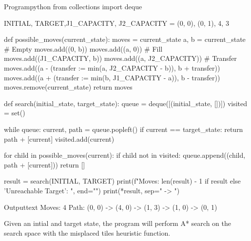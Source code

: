 \documentclass[11pt]{ipu-ai}
\begin{document}
    \begin{code}
        {Program}{python}
from collections import deque

INITIAL, TARGET,J1_CAPACITY, J2_CAPACITY = (0, 0), (0, 1), 4, 3

def possible_moves(current_state):
    moves = {current_state}
    a, b = current_state
    # Empty
    moves.add((0, b))
    moves.add((a, 0))
    # Fill
    moves.add((J1_CAPACITY, b))
    moves.add((a, J2_CAPACITY))
    # Transfer
    moves.add((a - (transfer := min(a, J2_CAPACITY - b)), b + transfer))
    moves.add((a + (transfer := min(b, J1_CAPACITY - a)), b - transfer))
    moves.remove(current_state)
    return moves

def search(initial_state, target_state):
    queue = deque([(initial_state, [])])
    visited = set()

    while queue:
        current, path = queue.popleft()
        if current == target_state:
            return path + [current]
        visited.add(current)

        for child in possible_moves(current):
            if child not in visited:
                queue.append((child, path + [current]))
    return []

result = search(INITIAL, TARGET)
print(f"Moves: {len(result) - 1 if result else 'Unreachable Target'}\nPath: ", end="")
print(*result, sep=" -> ")
    \end{code}%
    \begin{code}
        {Output}{text}
Moves: 4
Path: (0, 0) -> (4, 0) -> (1, 3) -> (1, 0) -> (0, 1)
    \end{code}
    \newpage%


    {Given an intial and target state, the program will perform A* search on the search space with the misplaced tiles
    heuristic function.}%

\end{document}
